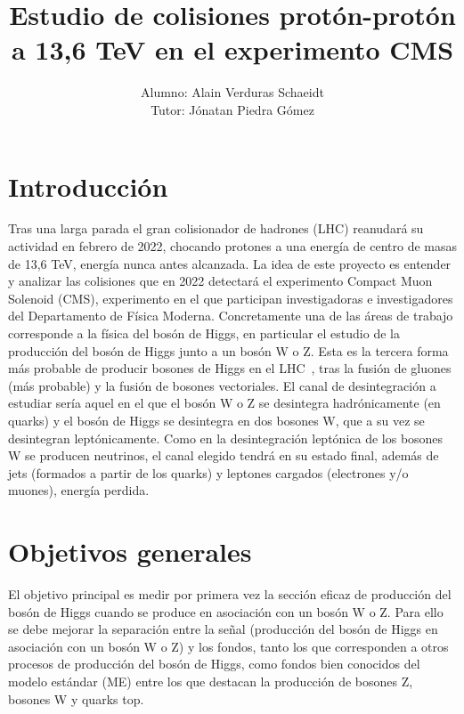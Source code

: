 \documentclass[11pt]{articulo}
\begin{document}
\title{\bf Estudio de colisiones prot\'on-prot\'on a 13,6 TeV en el experimento CMS}

\author{Alumno: Alain Verduras Schaeidt\\
    Tutor: J\'onatan Piedra G\'omez}
\maketitle

\section{Introducci\'on} 

Tras una larga parada el gran colisionador de hadrones (LHC) reanudar\'a su
actividad en febrero de 2022, chocando protones a una energ\'ia de centro de masas
de 13,6 TeV, energ\'ia nunca antes alcanzada. La idea de este proyecto es entender
y analizar las colisiones que en 2022 detectar\'a el experimento Compact Muon Solenoid
(CMS), experimento en el que participan investigadoras e investigadores del
Departamento de F\'isica Moderna. Concretamente una de las \'areas de trabajo
corresponde a la f\'isica del bos\'on de Higgs, en particular el estudio de la
producci\'on del bos\'on de Higgs junto a un bos\'on W o Z. Esta es la tercera
forma m\'as probable de producir bosones de Higgs en el LHC~\cite{HW}, tras la
fusi\'on de gluones (m\'as probable) y la fusi\'on de bosones vectoriales.
El canal de desintegraci\'on a estudiar ser\'ia aquel en el que el bos\'on
W o Z se desintegra hadr\'onicamente (en quarks) y el bos\'on de Higgs se desintegra
en dos bosones W, que a su vez se desintegran lept\'onicamente. Como en la
desintegraci\'on lept\'onica de los bosones W se producen neutrinos, el canal
elegido tendr\'a en su estado final, adem\'as de jets (formados a partir de los quarks)
y leptones cargados (electrones y/o muones), energ\'ia perdida.

\section{Objetivos generales}

El objetivo principal es medir por primera vez la secci\'on eficaz de producci\'on del bos\'on de Higgs cuando se produce en asociaci\'on con un bos\'on W o Z. Para ello se debe mejorar la separaci\'on entre la se\~nal (producci\'on del bos\'on de Higgs en asociaci\'on con un bos\'on W o Z) y los fondos, tanto los que corresponden a otros procesos de producci\'on del bos\'on de Higgs, como fondos bien conocidos del modelo est\'andar (ME) entre los que destacan la producci\'on de bosones Z, bosones W y quarks top.
\end{document}
